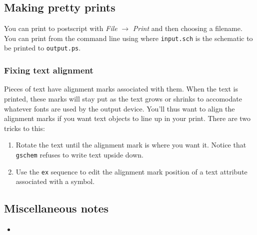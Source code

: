 \subsection{Making pretty prints}
You can print to postscript with \textsl{File} $\rightarrow$ \textsl{Print} and then choosing a filename.  You can print from the command line using
where \texttt{input.sch} is the schematic to be printed to \texttt{output.ps}. 

\subsubsection{Fixing text alignment}
Pieces of text have alignment marks associated with them.  When the text is printed, these marks will stay put as the text grows or shrinks to accomodate whatever fonts are used by the output device.  You'll thus want to align the alignment marks if you want text objects to line up in your print.  There are two tricks to this:



\begin{enumerate}
	\item Rotate the text until the alignment mark is where you want it.  Notice that \texttt{gschem} refuses to write text upside down.
	\item Use the \texttt{ex} sequence to edit the alignment mark position of a text attribute associated with a symbol.
\end{enumerate}



\subsection{Miscellaneous notes}

\begin{itemize}
	\item 
\end{itemize}
